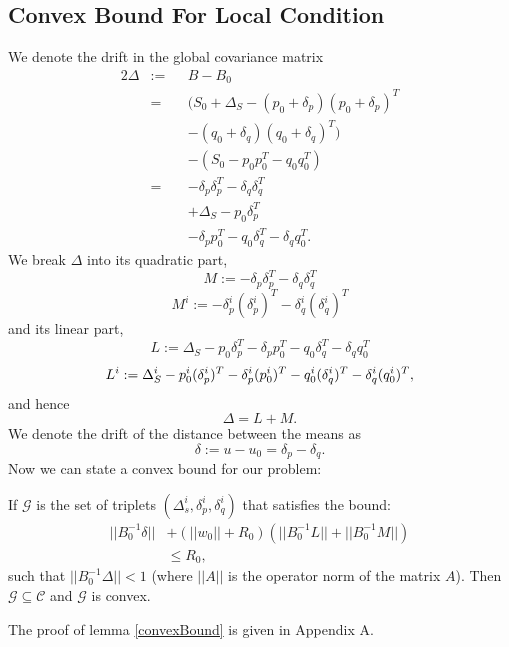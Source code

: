 \subsection{Convex Bound For Local Condition}
We denote the drift in the global covariance matrix
\begin{alignat*}{2}
\Delta & := && B-B_0 \\
& = && (S_0+\Delta_S - (p_0+\delta_p)(p_0+\delta_p)^T \\
& && - (q_0+\delta_q)(q_0+\delta_q)^T) \\
& && - (S_0 - p_0p_0^T - q_0q_0^T) \\
& = && - \delta_p\delta_p^T - \delta_q\delta_q^T \\
& && + \Delta_S - p_0\delta_p^T \\
& && - \delta_pp_0^T - q_0\delta_q^T - \delta_qq_0^T.
\end{alignat*}
We break $\Delta$ into its quadratic part,
\begin{equation*}
M:= - \delta_p\delta_p^T - \delta_q\delta_q^T
\end{equation*}
\begin{equation*}
M^i:= - \delta_p^i(\delta_p^i)^T - \delta_q^i(\delta_q^i)^T
\end{equation*}
and its linear part,
\begin{equation*}
L:= \Delta_S - p_0\delta_p^T - \delta_pp_0^T - q_0\delta_q^T - \delta_qq_0^T
\end{equation*}
\begin{equation*}
\\ L^i := \Delta_S^i - p_0^i(\delta_p^i)^T - \delta_p^i(p_0^i)^T -
q_0^i(\delta_q^i)^T - \delta_q^i(q_0^i)^T,
\end{equation*}
and hence
\begin{equation*}
\Delta= L+ M.
\end{equation*}
We denote the drift of the distance between the means as
\begin{equation*}
\delta:= u-u_0 = \delta_p - \delta_q.
\end{equation*}
Now we can state a convex bound for our problem:
\begin{lemma} \label{convexBound}
If $\mathcal{G}$ is the set of triplets $(\Delta_s^i, \delta_p^i, \delta_q^i)$
 that satisfies the bound:
 \begin{equation} \label{eq:convexBound}
\begin{split}
||B_0^{-1}\delta|| &+ (||w_0||+R_0)(||B_0^{-1}L||+||B_0^{-1}M||) \\ & \leq  R_0,
\end{split}
\end{equation}
such that $||B_0^{-1}\Delta|| < 1$
 (where $||A||$ is the operator norm of the matrix $A$). Then $\mathcal{G}\subseteq \mathcal{C}$ and $\mathcal{G}$ is convex.
\end{lemma}
The proof of lemma \ref{convexBound} is given in Appendix A.

